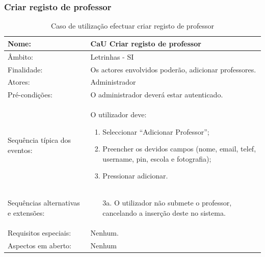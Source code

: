 \documentclass[a4paper]{article}
\begin{document}
	\subsubsection{Criar registo de professor}
			\begin {table}[h]
									\begin{tabular}{|p{2cm} p{10cm}|}
										\hline Nome: & CaU Criar registo de professor \\ 
										\hline Âmbito: & Letrinhas - SI \\ 
										\hline Finalidade: & Os actores envolvidos poderão, adicionar professores.  \\ 
										\hline Atores: & Administrador \\ 
									    \hline Pré-condições: & O administrador deverá estar autenticado.\\ 
									    \hline Sequência típica dos eventos: &  					
										O utilizador deve:
									    \begin{enumerate}
									    \item	Seleccionar “Adicionar Professor”;
										\item	Preencher os devidos  campos (nome, email, telef, username, pin, escola  e fotografia);
										\item	Pressionar adicionar.

		
			
									    \end{enumerate} \\ 
					  				    \hline Sequências alternativas e extensões: & 
					  				    \begin{enumerate}			    	
					  				   \item[ 3a.] O utilizador não submete o professor, cancelando a inserção deste no sistema.
		
			
					
					  				    \end{enumerate}
					  				     \\ 
					  				    \hline Requisitos especiais: & Nenhum.\\ 
					  				    \hline Aspectos em aberto: & Nenhum  \\
										\hline 
									\end{tabular}
									\caption{Caso de utilização efectuar criar registo de professor}
								\end{table} 
	
	
	

\newpage
\end{document}
